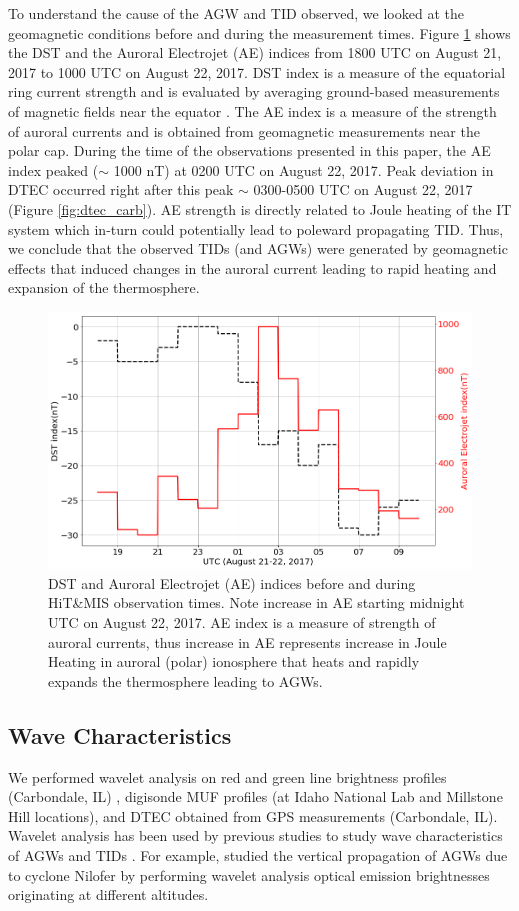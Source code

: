 To understand the cause of the AGW and TID observed, we looked at the geomagnetic conditions before and during the measurement times. Figure \ref{fig:gindx} shows the DST and the Auroral Electrojet (AE) indices from 1800 UTC on August 21, 2017 to 1000 UTC on August 22, 2017. DST  index is a measure of the equatorial ring current strength and is evaluated by averaging ground-based measurements of magnetic fields near the equator \citep{kauristie_dst}. The AE index is a measure of the strength of auroral currents and is obtained from geomagnetic measurements near the polar cap.  During the time of the observations presented in this paper, the AE index peaked ($\sim$ 1000 nT) at 0200 UTC on August 22, 2017. Peak deviation in DTEC  occurred right after this peak $\sim$ 0300-0500 UTC on August 22, 2017 (Figure \ref{fig:dtec_carb}). AE strength is directly related to Joule heating of the IT system \citep{ae_joule} which in-turn could potentially lead to poleward propagating TID. Thus, we conclude that the observed TIDs (and AGWs) were generated by geomagnetic effects that induced changes in the auroral current leading to rapid heating and expansion of the thermosphere. 
   \begin{figure}
 \centering\includegraphics[width=30pc]{tid_geindex.png}
 \caption{DST and Auroral Electrojet (AE) indices before and during HiT\&MIS observation times. Note increase in AE starting midnight UTC on August 22, 2017. AE index is a measure of strength of auroral currents, thus increase in AE represents increase in Joule Heating in auroral (polar) ionosphere that heats and rapidly expands the thermosphere leading to AGWs. }
 \label{fig:gindx}
 \end{figure}
 
\subsection{Wave Characteristics}
 We performed wavelet analysis on red and green line brightness profiles (Carbondale, IL) , digisonde MUF profiles (at Idaho National Lab and Millstone Hill locations), and DTEC obtained from GPS measurements (Carbondale, IL). Wavelet analysis has been used by previous studies to study wave characteristics of AGWs and TIDs \citep{singh_effect_2016,wvlt_B} . For example, \citet{singh_effect_2016} studied the vertical propagation of AGWs  due to cyclone Nilofer by performing wavelet analysis optical emission brightnesses originating at different altitudes.
 
